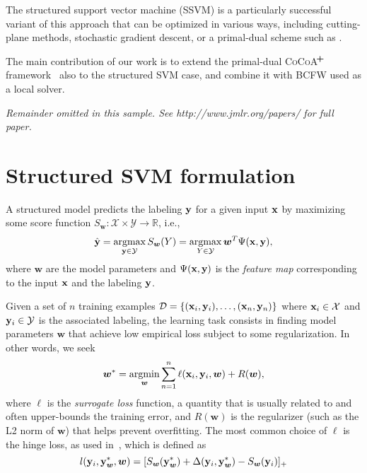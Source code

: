 \documentclass[twoside,11pt]{article}
\newcommand{\cocoap}{\textsc{CoCoA$\!^{\bf \textbf{\footnotesize+}}$}\xspace}
\newcommand{\dataset}{{\cal D}}
\newcommand{\xv}{{\bf x}}
\newcommand{\yv}{{\bf y}}
\newcommand{\argmax}{\operatornamewithlimits{argmax}}
\newcommand{\argmin}{\operatornamewithlimits{argmin}}
\newcommand{\0}{\mathbf{0}} %
\newcommand{\weight}{w}
\newcommand{\wv}{{\bm{\weight}}}
\begin{document}
The structured support vector machine (SSVM) is a particularly successful variant of this approach that can be optimized in various ways, including cutting-plane methods, stochastic gradient descent, or a primal-dual scheme such as \citep{LacosteJulien:2013ue}. 

The main contribution of our work is to extend the primal-dual \cocoap framework~\citep{Jaggi:2014vi,Ma:2015ti} also to the structured SVM case, and combine it with BCFW \citep{LacosteJulien:2013ue} used as a local solver.

{\noindent \em Remainder omitted in this sample. See http://www.jmlr.org/papers/ for full paper.}


%
\section{Structured SVM formulation}

A structured model predicts the labeling $\yv$ for a given input $\xv$ by maximizing some score function
$S_\wv:\mathcal{X} \times \mathcal{Y} \rightarrow \mathbb{R}$,
i.e.,
%
\begin{equation}
\label{eq:inference}
\hat{\yv} = \argmax_{\yv \in \mathcal{Y}} S_\wv(Y) = \argmax_{Y \in \mathcal{Y}} \wv^T\Psi(\xv,\yv),
\end{equation}
%
where $\wv$ are the model parameters and $\Psi(\xv,\yv)$ is the \emph{feature map} corresponding to the input $\xv$ and the labeling $\yv$.


Given a set of $n$ training examples $\dataset=\{(\xv_i,\yv_i), \dots, (\xv_n, \yv_n)\}$ where $\xv_i \in \mathcal{X}$ and $\yv_i \in \mathcal{Y}$ is the associated labeling, 
the learning task consists in finding model parameters $\wv$ that achieve low empirical loss subject to some regularization. In other words, we seek
%
\begin{align}
\label{eq:ssvm_primal}
\wv^* = \argmin_{\wv} \sum_{n=1}^n \ell(\xv_i, \yv_i, \wv) + R(\wv),
\end{align}
%
where $\ell$ is the \emph{surrogate loss} function,
a quantity that is usually related to and often upper-bounds the training error, 
and $R(\wv)$ is the regularizer (such as the L2 norm of $\wv$)
that helps prevent overfitting. 
The most common choice of $\ell$ is the hinge loss, as used in~\citep{Taskar:2003tt,Tsochantaridis:2005ww}, which is defined as
\begin{equation}
\label{eq:hinge-loss}
l(\yv_i, \yv^*_\wv, \wv) = [S_\wv(\yv^*_\wv) + \Delta(\yv_i, \yv^*_\wv) - S_\wv(\yv_i)]_+
\end{equation}
\end{document}
